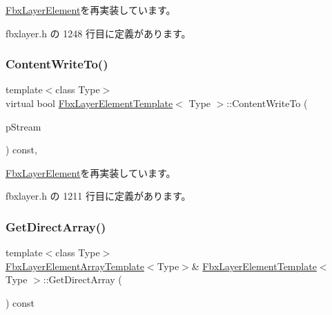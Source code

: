 \hyperlink{class_fbx_layer_element_a407c679ef12336f2cf916f598053bf02}{Fbx\+Layer\+Element}を再実装しています。



 fbxlayer.\+h の 1248 行目に定義があります。

\mbox{\label{class_fbx_layer_element_template_a035bb7adbe8edf5a861d6154c7ebeb8b}} 
\subsubsection{\texorpdfstring{Content\+Write\+To()}{ContentWriteTo()}}
{\footnotesize\ttfamily template$<$class Type$>$ \\
virtual bool \hyperlink{class_fbx_layer_element_template}{Fbx\+Layer\+Element\+Template}$<$ Type $>$\+::Content\+Write\+To (\begin{DoxyParamCaption}\item[{\hyperlink{class_fbx_stream}{Fbx\+Stream} \&}]{p\+Stream }\end{DoxyParamCaption}) const\hspace{0.3cm}{\ttfamily [inline]}, {\ttfamily [virtual]}}



\hyperlink{class_fbx_layer_element_aa60d2178a7601f0e78a472fa7fd774aa}{Fbx\+Layer\+Element}を再実装しています。



 fbxlayer.\+h の 1211 行目に定義があります。

\mbox{\label{class_fbx_layer_element_template_a42afd6d78d902570d7b2724cb0336226}} 
\subsubsection{\texorpdfstring{Get\+Direct\+Array()}{GetDirectArray()}\hspace{0.1cm}{\footnotesize\ttfamily [1/2]}}
{\footnotesize\ttfamily template$<$class Type$>$ \\
\hyperlink{class_fbx_layer_element_array_template}{Fbx\+Layer\+Element\+Array\+Template}$<$Type$>$\& \hyperlink{class_fbx_layer_element_template}{Fbx\+Layer\+Element\+Template}$<$ Type $>$\+::Get\+Direct\+Array (\begin{DoxyParamCaption}{ }\end{DoxyParamCaption}) const\hspace{0.3cm}{\ttfamily [inline]}}


